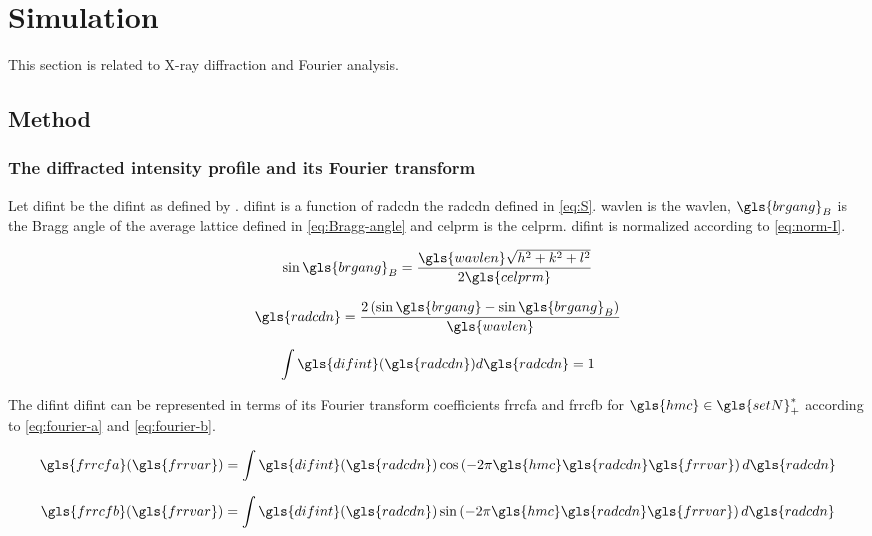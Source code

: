 \section{Simulation}

This section is related to X-ray diffraction and Fourier analysis.

\subsection{Method}

\subsubsection{The diffracted intensity profile and its Fourier transform}

Let \gls{difint} be the \glsdesc{difint} as defined by \textcite{W1979}.
\gls{difint} is a function of \gls{radcdn} the \glsdesc{radcdn} defined in \eqref{eq:S}.
\gls{wavlen} is the \glsdesc{wavlen}, \( \gls{brgang}_B \) is the Bragg angle of the average lattice defined in \eqref{eq:Bragg-angle} and \gls{celprm} is the \glsdesc{celprm}.
\gls{difint} is normalized according to \eqref{eq:norm-I}.

\begin{equation}\label{eq:Bragg-angle}
\sin \gls{brgang}_B = \frac{\gls{wavlen} \sqrt{h^2+k^2+l^2}}{2 \gls{celprm}}
\end{equation}

\begin{equation}\label{eq:S}
\gls{radcdn} = \frac{2 \left( \sin \gls{brgang} - \sin \gls{brgang}_B \right)}{\gls{wavlen}}
\end{equation}

\begin{equation}\label{eq:norm-I}
\int \gls{difint}(\gls{radcdn}) d\gls{radcdn} = 1
\end{equation}

The \glsdesc{difint} \gls{difint} can be represented in terms of its Fourier transform coefficients \gls{frrcfa} and \gls{frrcfb} for \( {\gls{hmc}} \in \gls{setN}^*_+ \) according to \eqref{eq:fourier-a} and \eqref{eq:fourier-b}.

\begin{equation}\label{eq:fourier-a}
\gls{frrcfa}(\gls{frrvar}) = \int \gls{difint}(\gls{radcdn}) \cos \left( -2 \pi \gls{hmc} \gls{radcdn} \gls{frrvar} \right) d\gls{radcdn}
\end{equation}

\begin{equation}\label{eq:fourier-b}
\gls{frrcfb}(\gls{frrvar}) = \int \gls{difint}(\gls{radcdn}) \sin \left( -2 \pi \gls{hmc} \gls{radcdn} \gls{frrvar} \right) d\gls{radcdn}
\end{equation}


